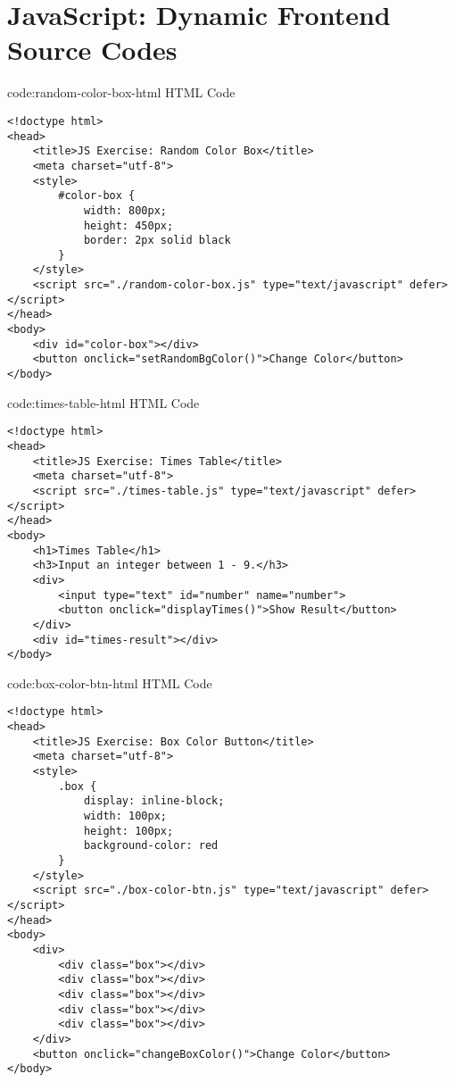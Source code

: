 \section{JavaScript: Dynamic Frontend Source Codes}\label{sect:js-dynamic-frontend-codes}

\begin{codeenv}{code:random-color-box-html}{ HTML Code}
\begin{verbatim}
<!doctype html>
<head>
    <title>JS Exercise: Random Color Box</title>
    <meta charset="utf-8">
    <style>
        #color-box {
            width: 800px;
            height: 450px;
            border: 2px solid black
        }
    </style>
    <script src="./random-color-box.js" type="text/javascript" defer></script>
</head>
<body>
    <div id="color-box"></div>
    <button onclick="setRandomBgColor()">Change Color</button>
</body>
\end{verbatim}
\end{codeenv}

\begin{codeenv}{code:times-table-html}{ HTML Code}\begin{verbatim}
<!doctype html>
<head>
    <title>JS Exercise: Times Table</title>
    <meta charset="utf-8">
    <script src="./times-table.js" type="text/javascript" defer></script>
</head>
<body>
    <h1>Times Table</h1>
    <h3>Input an integer between 1 - 9.</h3>
    <div>
        <input type="text" id="number" name="number">
        <button onclick="displayTimes()">Show Result</button>
    </div>
    <div id="times-result"></div>
</body>
\end{verbatim}
\end{codeenv}

\begin{codeenv}{code:box-color-btn-html}{ HTML Code}
\begin{verbatim}
<!doctype html>
<head>
    <title>JS Exercise: Box Color Button</title>
    <meta charset="utf-8">
    <style>
        .box {
            display: inline-block;
            width: 100px;
            height: 100px;
            background-color: red
        }
    </style>
    <script src="./box-color-btn.js" type="text/javascript" defer></script>
</head>
<body>
    <div>
        <div class="box"></div>
        <div class="box"></div>
        <div class="box"></div>
        <div class="box"></div>
        <div class="box"></div>
    </div>
    <button onclick="changeBoxColor()">Change Color</button>
</body>
\end{verbatim}
\end{codeenv}

